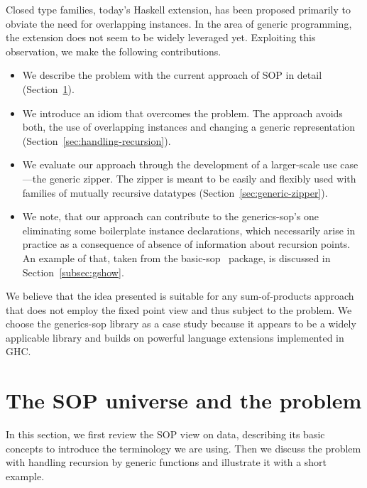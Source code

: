 \documentclass[runningheads]{llncs}
\begin{document}
Closed type families, today's Haskell extension, has been proposed primarily to obviate the need for overlapping instances. In the area of generic programming, the extension does not seem to be widely leveraged yet. Exploiting this observation, we make the following contributions.
\begin{itemize}
\item We describe the problem with the current approach of SOP in detail (Section~\ref{sec:sop-problem}).
\item We introduce an idiom that overcomes the problem. The approach avoids both, the use of overlapping instances and changing a generic representation (Section~\ref{sec:handling-recursion}).
\item We evaluate our approach through the development of a larger-scale use case---the generic zipper. The zipper is meant to be easily and flexibly used with families of mutually recursive datatypes (Section~\ref{sec:generic-zipper}).
\item We note, that our approach can contribute to the \textsf{generics-sop}'s one eliminating some boilerplate instance declarations, which necessarily  arise in practice as a consequence of absence of information about recursion points. An example of that, taken from the \textsf{basic-sop}~\cite{basic-sop} package, is discussed in Section~\ref{subsec:gshow}.
\end{itemize}

We believe that the idea presented is suitable for any sum-of-products approach that does not employ the fixed point view and thus subject to the problem. We choose the \textsf{generics-sop} library as a case study because it appears to be a widely applicable library and builds on powerful language extensions implemented in GHC.

\section{The SOP universe and the problem}
\label{sec:sop-problem}

In this section, we first review the SOP view on data, describing its basic concepts to introduce the terminology we are using. Then we discuss the problem with handling recursion by generic functions and illustrate it with a short example.
\end{document}
